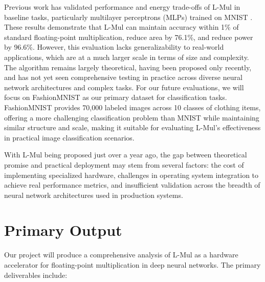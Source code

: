 \documentclass[12pt,letterpaper]{article}
\begin{document}
Previous work has validated performance and energy trade-offs of L-Mul in baseline tasks, particularly multilayer perceptrons (MLPs) trained on MNIST \citep{lmul2023capstone}. These results demonstrate that L-Mul can maintain accuracy within 1\% of standard floating-point multiplication, reduce area by 76.1\%, and reduce power by 96.6\%. However, this evaluation lacks generalizability to real-world applications, which are at a much larger scale in terms of size and complexity. The algorithm remains largely theoretical, having been proposed only recently, and has not yet seen comprehensive testing in practice across diverse neural network architectures and complex tasks. For our future evaluations, we will focus on FashionMNIST as our primary dataset for classification tasks. FashionMNIST provides 70,000 labeled images across 10 classes of clothing items, offering a more challenging classification problem than MNIST while maintaining similar structure and scale, making it suitable for evaluating L-Mul's effectiveness in practical image classification scenarios.

With L-Mul being proposed just over a year ago, the gap between theoretical promise and practical deployment may stem from several factors: the cost of implementing specialized hardware, challenges in operating system integration to achieve real performance metrics, and insufficient validation across the breadth of neural network architectures used in production systems.

\section{Primary Output}

Our project will produce a comprehensive analysis of L-Mul as a hardware accelerator for floating-point multiplication in deep neural networks. The primary deliverables include:
\end{document}
